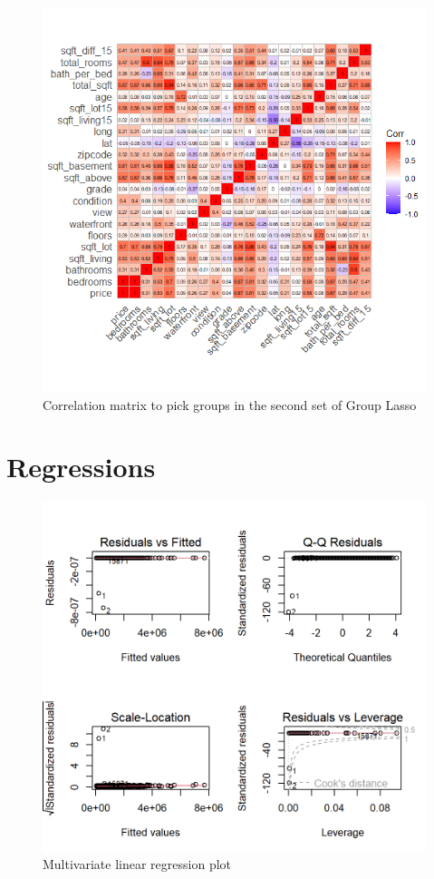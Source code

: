 \documentclass[a4paper, 9pt]{article}
\begin{document}
\begin{figure}[H]
\includegraphics[scale=0.8]{corrmatplot}
\centering
\caption{Correlation matrix to pick groups in the second set of Group Lasso}
\end{figure}


\section{Regressions}
\begin{figure}[H]
\includegraphics[scale=0.9]{MLR}
\centering
\caption{Multivariate linear regression plot}
\end{figure}
\end{document}
